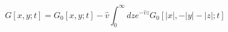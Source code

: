 \begin{equation}
\label{eucli1}
G[x, y; t] = G_0[x, y; t] - \hat{v} \int_0^{\infty} dz
e^{-\hat{v} z} G_0[|x|, -|y|-|z|; t]
\end{equation}

